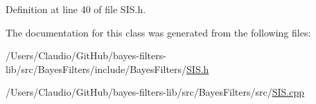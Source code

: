 Definition at line 40 of file S\+I\+S.\+h.



The documentation for this class was generated from the following files\+:\begin{DoxyCompactItemize}
\item 
/\+Users/\+Claudio/\+Git\+Hub/bayes-\/filters-\/lib/src/\+Bayes\+Filters/include/\+Bayes\+Filters/\mbox{\hyperlink{SIS_8h}{S\+I\+S.\+h}}\item 
/\+Users/\+Claudio/\+Git\+Hub/bayes-\/filters-\/lib/src/\+Bayes\+Filters/src/\mbox{\hyperlink{SIS_8cpp}{S\+I\+S.\+cpp}}\end{DoxyCompactItemize}
